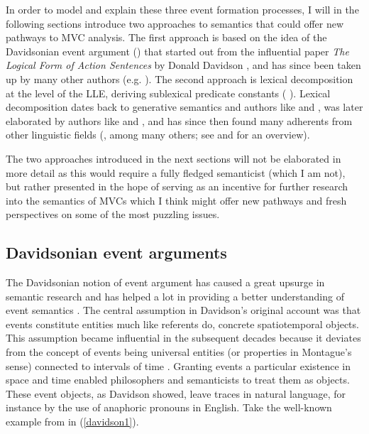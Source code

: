 In order to model and explain these three event formation processes, I will in the following sections introduce two approaches to semantics that could offer new pathways to MVC analysis. The first approach is based on the idea of the Davidsonian event argument () that started out from the influential paper \textit{The Logical Form of Action Sentences} by Donald Davidson \citep{davidson1967logical}, and has since been taken up by many other authors (e.g. \citealt{higginbotham1985semantics, higginbotham2000events, kratzer1995individual, chierchia19953, maienborn2005limits, maienborn2011event}). The second approach is lexical decomposition at the level of the LLE, deriving sublexical predicate constants ( ). Lexical decomposition dates back to generative semantics and authors like \citet{lakoff1970linguistics} and \citet{mccawley1971prelexical}, was later elaborated by authors like \citet{Dowty1979} and \citet{Jackendoff1990}, and has since then found many adherents from other linguistic fields (\citealt{rappaport1998building, levin2005argument, van1997syntax}, among many others; see \citealt{engelberg2011frameworks} and \citealt{wunderlich2012lexical} for an overview).

The two approaches introduced in the next sections will not be elaborated in more detail as this would require a fully fledged semanticist (which I am not), but rather presented in the hope of serving as an incentive for further research into the semantics of MVCs which I think might offer new pathways and fresh perspectives on some of the most puzzling issues.

\subsection{Davidsonian event arguments} \label{sec:davidsonian}

The Davidsonian notion of event argument has caused a great upsurge in semantic research and has helped a lot in providing a better understanding of event semantics \citep{maienborn2005limits}. The central assumption in Davidson's original account was that events constitute entities much like referents do, concrete spatiotemporal objects. This assumption became influential in the subsequent decades because it deviates from the concept of events being universal entities (or properties in Montague's sense) connected to intervals of time \citep{pianesi2000events}. Granting events a particular existence in space and time enabled philosophers and semanticists to treat them as objects. These event objects, as Davidson showed, leave traces in natural language, for instance by the use of anaphoric pronouns in English. Take the well-known example from \citet{davidson1967logical} in (\ref{davidson1}).

